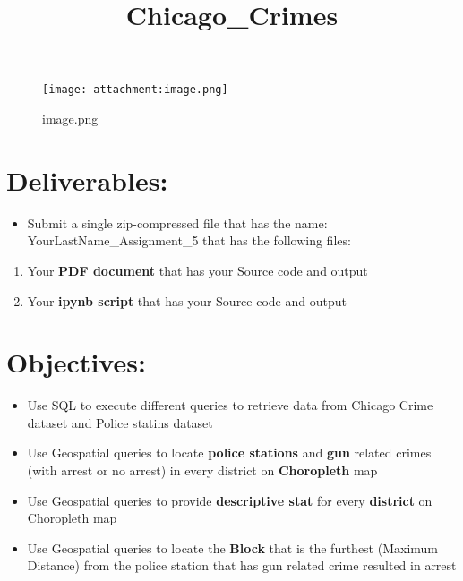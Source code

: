 \documentclass[11pt]{article}
\title{Chicago\_Crimes}
\makeatletter
\def\maxwidth{\ifdim\Gin@nat@width>\linewidth\linewidth
    \else\Gin@nat@width\fi}
\let\Oldincludegraphics\includegraphics
\renewcommand{\includegraphics}[1]{\Oldincludegraphics[width=.8\maxwidth]{#1}}
\providecommand{\tightlist}{%
      \setlength{\itemsep}{0pt}\setlength{\parskip}{0pt}}
\makeatother
\begin{document}
    
    
    \maketitle
    
    

    
    \begin{figure}
\centering
\texttt{[image: attachment:image.png]}
\caption{image.png}
\end{figure}

    \hypertarget{deliverables}{%
\section{Deliverables:}\label{deliverables}}

\begin{itemize}
\tightlist
\item
  Submit a single zip-compressed file that has the name:
  YourLastName\_Assignment\_5 that has the following files:
\end{itemize}

\begin{enumerate}
\def\labelenumi{\arabic{enumi}.}
\tightlist
\item
  Your \textbf{PDF document} that has your Source code and output
\item
  Your \textbf{ipynb script} that has your Source code and output
\end{enumerate}

\hypertarget{objectives}{%
\section{Objectives:}\label{objectives}}

\begin{itemize}
\tightlist
\item
  Use SQL to execute different queries to retrieve data from Chicago
  Crime dataset and Police statins dataset
\item
  Use Geospatial queries to locate \textbf{police stations} and
  \textbf{gun} related crimes (with arrest or no arrest) in every
  district on \textbf{Choropleth} map
\item
  Use Geospatial queries to provide \textbf{descriptive stat} for every
  \textbf{district} on Choropleth map
\item
  Use Geospatial queries to locate the \textbf{Block} that is the
  furthest (Maximum Distance) from the police station that has gun
  related crime resulted in arrest
\end{itemize}
\end{document}
